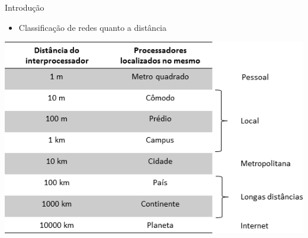 \documentclass{libs/ufc_format}
\begin{document}
\begin{frame}{Introdução}
    \begin{itemize}
        \item Classificação de redes quanto a distância
    \end{itemize}
    \centering
    \includegraphics[scale=0.65]{media/clsredes}
\end{frame}
\end{document}
